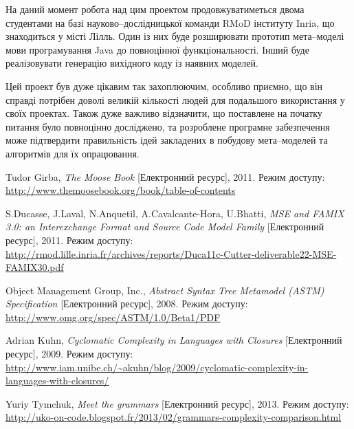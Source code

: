 \documentclass[12pt,a4paper]{article}
\begin{document}
На даний момент робота над цим проектом продовжуватиметься двома студентами на базі науково--дослідницької команди RMoD інституту Inria, що знаходиться у місті Лілль. Один із них буде розширювати прототип мета--моделі мови програмування Java до повноцінної функціональності. Інший буде реалізовувати генерацію вихідного коду із наявних моделей.

Цей проект був дуже цікавим так захоплюючим, особливо приємно, що він справді потрібен доволі великій кількості людей для подальшого використання у своїх проектах. Також дуже важливо відзначити, що поставлене на початку питання було повноцінно досліджено, та розроблене програмне забезпечення може підтвердити правильність ідей закладених в побудову мета--моделей та алгоритмів для їх опрацювання.

\clearpage

\begin{thebibliography}{9}

Tudor Girba, \emph{The Moose Book} [Електронний ресурс],
    2011. Режим доступу:
    \url{http://www.themoosebook.org/book/table-of-contents}

S.Ducasse, J.Laval, N.Anquetil, A.Cavalcante-Hora, U.Bhatti, \emph{MSE and FAMIX 3.0: an Interexchange Format and Source Code Model Family} [Електронний ресурс], 2011. Режим доступу:
    \url{http://rmod.lille.inria.fr/archives/reports/Duca11c-Cutter-deliverable22-MSE-FAMIX30.pdf}
    
Object Management Group, Inc., \emph{Abstract Syntax Tree Metamodel (ASTM) Specification} [Електронний ресурс], 2008. Режим доступу:
    \url{http://www.omg.org/spec/ASTM/1.0/Beta1/PDF}

Adrian Kuhn, \emph{Cyclomatic Complexity in Languages with Closures} [Електронний ресурс], 2009. Режим доступу:
    \url{http://www.iam.unibe.ch/~akuhn/blog/2009/cyclomatic-complexity-in-languages-with-closures/}

Yuriy Tymchuk, \emph{Meet the grammars} [Електронний ресурс], 2013. Режим доступу:
    \url{http://uko-on-code.blogspot.fr/2013/02/grammars-complexity-comparison.html}

\end{thebibliography}
\end{document}
